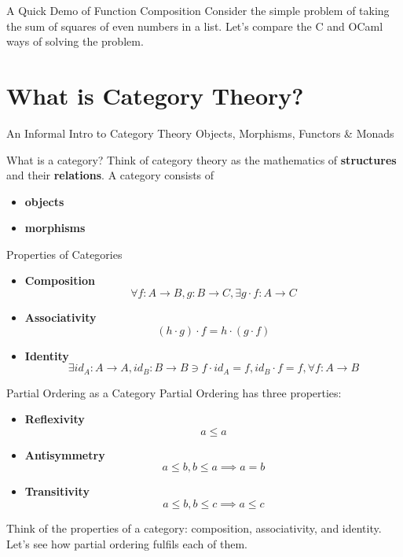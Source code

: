 \documentclass{purdue-slide}
\begin{document}
\begin{frame}{A Quick Demo of Function Composition}
    Consider the simple problem of taking the sum of squares of even numbers in a list. Let's compare the C and OCaml ways of solving the problem.
\end{frame}

\section{What is Category Theory?}

\begin{titleframe}{An Informal Intro to Category Theory}
Objects, Morphisms, Functors \& Monads
\end{titleframe}

\begin{frame}{What is a category?}
    Think of category theory as the mathematics of \textbf{structures} and their \textbf{relations}. A category consists of \begin{itemize}
        \item \textbf{objects}
        \item \textbf{morphisms}
    \end{itemize}
\end{frame}

\begin{frame}{Properties of Categories}
    \begin{itemize}
        \item \textbf{Composition} $$\forall f: A \rightarrow B, g: B \rightarrow C, \exists g \cdot f: A \rightarrow C$$
        \item \textbf{Associativity} $$(h \cdot g) \cdot f = h \cdot (g \cdot f)$$
        \item \textbf{Identity} $$\exists id_{A}: A \rightarrow A, id_{B}: B \rightarrow B \ni f \cdot id_{A} = f, id_{B} \cdot f = f, \forall f: A \rightarrow B$$
    \end{itemize}
\end{frame}

\begin{frame}{Partial Ordering as a Category}
    Partial Ordering has three properties: \begin{itemize}
        \item \textbf{Reflexivity} $$a \leq a$$
        \item \textbf{Antisymmetry} $$a \leq b, b \leq a \implies a = b$$
        \item \textbf{Transitivity} $$a \leq b, b \leq c \implies a \leq c$$
    \end{itemize}

    Think of the properties of a category: composition, associativity, and identity. Let's see how partial ordering fulfils each of them.
\end{frame}
\end{document}
